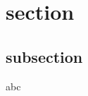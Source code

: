 \documentclass[11pt,xcolor={dvipsnames}]{beamer}
\begin{document}
\section{section}
\subsection{subsection}
\begin{frame}
    abc
\end{frame} 
\end{document}
